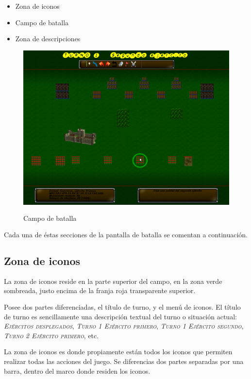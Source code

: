 \begin{itemize}
\item Zona de iconos
\item Campo de batalla
\item Zona de descripciones
\end{itemize}

\begin{figure}[h]
\centering
\includegraphics[scale=.4]{./imagenes/campobatalla.png}
\label{fig:campobatalla}
\caption{Campo de batalla}
\end{figure}

Cada una de éstas secciones de la pantalla de batalla se comentan a continuación.

\subsection*{Zona de iconos}
La zona de iconos reside en la parte superior del campo, en la zona
verde sombreada, justo encima de la franja roja transparente
superior.

Posee dos partes diferenciadas, el título de turno, y el menú de
iconos. El título de turno es sencillamente una descripción textual
del turno o situación actual: \textit{\textsc{Ejércitos desplegados}},
\textit{\textsc{Turno 1 Ejército primero}}, \textit{\textsc{Turno 1
    Ejército segundo}}, \textit{\textsc{Turno 2 Ejército primero}},
etc.

La zona de iconos es donde propiamente están todos los iconos que
permiten realizar todas las acciones del juego. Se diferencias dos
partes separadas por una barra, dentro del marco donde residen los
iconos.

